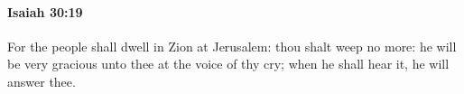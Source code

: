 
		\paragraph{Isaiah 30:19} %
			\label{ISAIAH-30-19}

			For the people shall dwell in Zion at Jerusalem: thou shalt weep no more: he will be very gracious unto thee at the voice of thy cry; when he shall hear it, he will answer thee.


